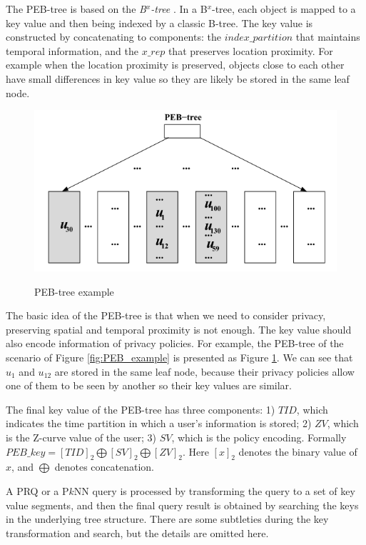 \documentclass[paper=a4, fontsize=18pt]{article} %
\numberwithin{equation}{section} %
\numberwithin{figure}{section} %
\numberwithin{table}{section} %
\begin{document}
The PEB-tree is based on the \emph{B$^x$-tree} \cite{JLO04}. In a B$^x$-tree, each object is mapped to a key value and then being indexed by a classic B-tree. The key value is constructed by concatenating to components: the $index\_partition$ that maintains temporal information, and the $x\_rep$ that preserves location proximity. For example when the location proximity is preserved, objects close to each other have small differences in key value so they are likely be stored in the same leaf node.

\begin{figure}[h]
  \centering
  \includegraphics[width=.6\linewidth]{74_peb_tree.png}\\
  \caption{PEB-tree example}\label{fig:PEB_tree}
\end{figure}


The basic idea of the PEB-tree is that when we need to consider privacy, preserving spatial and temporal proximity is not enough. The key value should also encode information of privacy policies. For example, the PEB-tree of the scenario of Figure \ref{fig:PEB_example} is presented as Figure \ref{fig:PEB_tree}. We can see that $u_1$ and $u_{12}$ are stored in the same leaf node, because their privacy policies allow one of them to be seen by another so their key values are similar.

The final key value of the PEB-tree has three components: 1) $TID$, which indicates the time partition in which a user's information is stored; 2) $ZV$, which is the Z-curve \cite{MJFS01} value of the user; 3) $SV$, which is the policy encoding. Formally $PEB\_key = [TID]_2 \bigoplus [SV]_2 \bigoplus [ZV]_2$. Here $[x]_2$ denotes the binary value of $x$, and $\bigoplus$ denotes concatenation.

A PRQ or a P$k$NN query is processed by transforming the query to a set of key value segments, and then the final query result is obtained by searching the keys in the underlying tree structure. There are some subtleties during the key transformation and search, but the details are omitted here.
\end{document}
